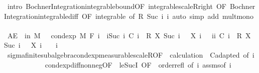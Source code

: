 \begin{isabellebody}
\ {\isacharparenleft}{\kern0pt}intro\ Bochner{\isacharunderscore}{\kern0pt}Integration{\isachardot}{\kern0pt}integrable{\isacharunderscore}{\kern0pt}bound{\isacharbrackleft}{\kern0pt}OF\ integrable{\isacharunderscore}{\kern0pt}scaleR{\isacharunderscore}{\kern0pt}right{\isacharcomma}{\kern0pt}\ OF\ Bochner{\isacharunderscore}{\kern0pt}Integration{\isachardot}{\kern0pt}integrable{\isacharunderscore}{\kern0pt}diff{\isacharcomma}{\kern0pt}\ OF\ integrable{\isacharparenleft}{\kern0pt}{}{\isacharcomma}{\kern0pt}{}{\isacharparenright}{\kern0pt}{\isacharcomma}{\kern0pt}\ of\ R\ {\isachardoublequoteopen}Suc\ i{\isachardoublequoteclose}\ i{\isacharbrackright}{\kern0pt}{\isacharparenright}{\kern0pt}\ {\isacharparenleft}{\kern0pt}auto\ simp\ add{\isacharcolon}{\kern0pt}\ mult{\isacharunderscore}{\kern0pt}mono{\isacharparenright}{\kern0pt}\isanewline
\ \ \isamarkupfalse%
\ \isamarkupfalse%
\ {\isachardoublequoteopen}AE\ {\isasymxi}\ in\ M{\isachardot}{\kern0pt}\ {}\ {\isasymle}\ cond{\isacharunderscore}{\kern0pt}exp\ M\ {\isacharparenleft}{\kern0pt}F\ i{\isacharparenright}{\kern0pt}\ {\isacharparenleft}{\kern0pt}{\isasymlambda}{\isasymxi}{\isachardot}{\kern0pt}\ {\isacharparenleft}{\kern0pt}{\isasymSum}i{\isacharless}{\kern0pt}Suc\ i{\isachardot}{\kern0pt}\ C\ i\ {\isasymxi}\ {\isacharasterisk}{\kern0pt}\isactrlsub R\ {\isacharparenleft}{\kern0pt}X\ {\isacharparenleft}{\kern0pt}Suc\ i{\isacharparenright}{\kern0pt}\ {\isasymxi}\ {\isacharminus}{\kern0pt}\ X\ i\ {\isasymxi}{\isacharparenright}{\kern0pt}{\isacharparenright}{\kern0pt}\ {\isacharminus}{\kern0pt}\ {\isacharparenleft}{\kern0pt}{\isasymSum}i{\isacharless}{\kern0pt}i{\isachardot}{\kern0pt}\ C\ i\ {\isasymxi}\ {\isacharasterisk}{\kern0pt}\isactrlsub R\ {\isacharparenleft}{\kern0pt}X\ {\isacharparenleft}{\kern0pt}Suc\ i{\isacharparenright}{\kern0pt}\ {\isasymxi}\ {\isacharminus}{\kern0pt}\ X\ i\ {\isasymxi}{\isacharparenright}{\kern0pt}{\isacharparenright}{\kern0pt}{\isacharparenright}{\kern0pt}\ {\isasymxi}{\isachardoublequoteclose}\ \ i\ \isanewline
\ \ \ \ \isamarkupfalse%
\ sigma{\isacharunderscore}{\kern0pt}finite{\isacharunderscore}{\kern0pt}subalgebra{\isachardot}{\kern0pt}cond{\isacharunderscore}{\kern0pt}exp{\isacharunderscore}{\kern0pt}measurable{\isacharunderscore}{\kern0pt}scaleR{\isacharbrackleft}{\kern0pt}OF\ {\isacharunderscore}{\kern0pt}\ calculation\ {\isacharunderscore}{\kern0pt}\ C{\isachardot}{\kern0pt}adapted{\isacharcomma}{\kern0pt}\ of\ i{\isacharbrackright}{\kern0pt}\ \isanewline
\ \ \ \ \ \ \ \ \ \ cond{\isacharunderscore}{\kern0pt}exp{\isacharunderscore}{\kern0pt}diff{\isacharunderscore}{\kern0pt}nonneg{\isacharbrackleft}{\kern0pt}OF\ {\isacharunderscore}{\kern0pt}\ le{\isacharunderscore}{\kern0pt}SucI{\isacharcomma}{\kern0pt}\ OF\ {\isacharunderscore}{\kern0pt}\ order{\isachardot}{\kern0pt}refl{\isacharcomma}{\kern0pt}\ of\ i{\isacharbrackright}{\kern0pt}\ assms{\isacharparenleft}{\kern0pt}{}{\isacharcomma}{\kern0pt}{}{\isacharparenright}{\kern0pt}{\isacharbrackleft}{\kern0pt}of\ i{\isacharbrackright}{\kern0pt}\ \isamarkupfalse%

\end{isabellebody}
